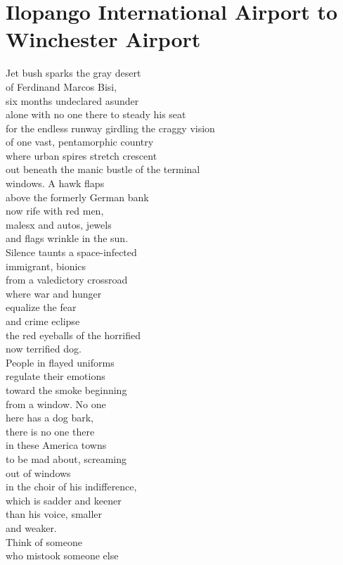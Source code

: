 \documentclass[smalldemyvopaper,11pt,twoside,onecolumn,openright,extrafontsizes]{memoir}
\begin{document}
\chapter{Ilopango International Airport to Winchester Airport}
Jet bush sparks the gray desert
\\of Ferdinand Marcos Bisi,
\\six months undeclared asunder
\\alone with no one there to steady his seat
\\for the endless runway girdling the craggy vision
\\of one vast, pentamorphic country
\\where urban spires stretch crescent
\\out beneath the manic bustle of the terminal
\\windows. A hawk flaps
\\above the formerly German bank
\\now rife with red men,
\\malesx and autos, jewels
\\and flags wrinkle in the sun.
\\Silence taunts a space-infected
\\immigrant, bionics
\\from a valedictory crossroad
\\where war and hunger
\\equalize the fear
\\and crime eclipse
\\the red eyeballs of the horrified
\\now terrified dog.
\\People in flayed uniforms
\\regulate their emotions
\\toward the smoke beginning
\\from a window. No one
\\here has a dog bark,
\\there is no one there
\\in these America towns
\\to be mad about, screaming
\\out of windows
\\in the choir of his indifference,
\\which is sadder and keener
\\than his voice, smaller
\\and weaker.
\\Think of someone
\\who mistook someone else
\end{document}
